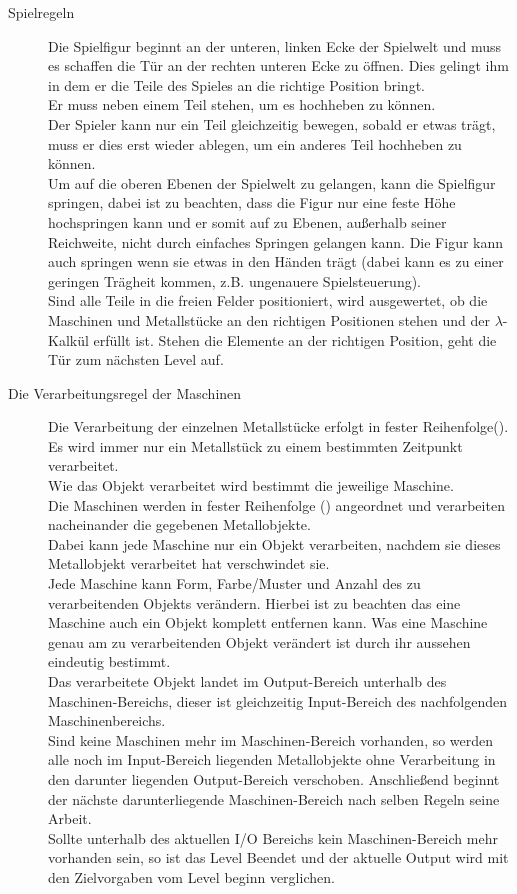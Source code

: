 \documentclass{scrartcl}
\begin{document}
\begin{description}
	\item[Spielregeln] \label{spielaufbau:Spielregeln} Die Spielfigur beginnt an der unteren, linken Ecke der Spielwelt und muss es schaffen die Tür an der rechten unteren Ecke zu öffnen. Dies gelingt ihm in dem er die Teile des Spieles an die richtige Position bringt.\\
	Er muss neben einem Teil stehen, um es hochheben zu können.\\
	Der Spieler kann nur ein Teil gleichzeitig bewegen, sobald er etwas trägt, muss er dies erst wieder ablegen, um ein anderes Teil hochheben zu können. \\
	Um auf die oberen Ebenen der Spielwelt zu gelangen, kann die Spielfigur springen, dabei ist zu beachten, dass die Figur nur eine feste Höhe hochspringen kann und er somit auf zu Ebenen, außerhalb seiner Reichweite, nicht durch einfaches Springen gelangen kann. Die Figur kann auch springen wenn sie etwas in den Händen trägt (dabei kann es zu einer geringen Trägheit kommen, z.B. ungenauere Spielsteuerung).\\
	Sind alle Teile in die freien Felder positioniert, wird ausgewertet, ob die Maschinen und Metallstücke an den richtigen Positionen stehen und der $\lambda$-Kalkül erfüllt ist. Stehen die Elemente an der richtigen Position, geht die Tür zum nächsten Level auf.

	
	\item[Die Verarbeitungsregel der Maschinen] Die Verarbeitung der einzelnen Metallstücke erfolgt in fester Reihenfolge().\\
	Es wird immer nur ein Metallstück zu einem bestimmten Zeitpunkt verarbeitet.\\
	Wie das Objekt verarbeitet wird bestimmt die jeweilige Maschine.\\
	Die Maschinen werden in fester Reihenfolge () angeordnet und verarbeiten nacheinander die gegebenen Metallobjekte.\\
	Dabei kann jede Maschine nur ein Objekt verarbeiten, nachdem sie dieses Metallobjekt verarbeitet hat verschwindet sie.\\
	Jede Maschine kann Form, Farbe/Muster und Anzahl des zu verarbeitenden Objekts verändern. Hierbei ist zu beachten das eine Maschine auch ein Objekt komplett entfernen kann. Was eine Maschine genau am zu verarbeitenden Objekt verändert ist durch ihr aussehen eindeutig bestimmt.\\
	Das verarbeitete Objekt landet im Output-Bereich unterhalb des Maschinen-Bereichs, dieser ist gleichzeitig Input-Bereich des nachfolgenden Maschinenbereichs.\\
	Sind keine Maschinen mehr im Maschinen-Bereich vorhanden, so werden alle noch im Input-Bereich liegenden Metallobjekte ohne Verarbeitung in den darunter liegenden Output-Bereich verschoben. Anschließend beginnt der nächste darunterliegende Maschinen-Bereich nach selben Regeln seine Arbeit.\\
	Sollte unterhalb des aktuellen I/O Bereichs kein Maschinen-Bereich mehr vorhanden sein, so ist das Level Beendet und der aktuelle Output wird mit den Zielvorgaben vom Level beginn verglichen.
	

\end{description}
\end{document}
